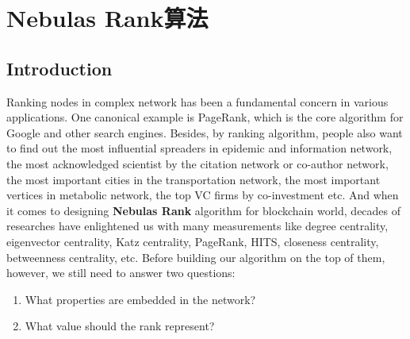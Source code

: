\section{Nebulas Rank算法}


\subsection{Introduction} \label{sec:intro}
Ranking nodes in complex network has been a fundamental concern in various applications. One canonical example is PageRank\cite{Brin2010}\cite{page1999pagerank}, which is the core algorithm for Google and other search engines\cite{langville2011google}. Besides, by ranking algorithm, people also want to find out the most influential spreaders in epidemic and information network\cite{doerr2012rumors}\cite{Kitsak2010}, the most acknowledged scientist by the citation network or co-author network\cite{walker2007ranking}\cite{chen2007finding}\cite{Radicchi2009}, the most important cities in the transportation network\cite{guimera2005worldwide}, the most important vertices in metabolic network\cite{ivan2010web}, the top VC firms by co-investment\cite{Bhat2012} etc. And when it comes to designing \textbf{Nebulas Rank} algorithm for blockchain world, decades of researches have enlightened us with many measurements like degree centrality\cite{freeman1979set}, eigenvector centrality\cite{bonacich1972factoring}, Katz centrality\cite{katz1953new}, PageRank\cite{Brin2010}, HITS\cite{kleinberg1999authoritative}, closeness centrality\cite{sabidussi1966centrality}, betweenness centrality\cite{freeman1977set}\cite{freeman1978centrality}\cite{freeman1991centrality}\cite{noh2004random}\cite{newman2005measure}, etc. Before building our algorithm on the top of them, however, we still need to answer two questions:

\begin{enumerate}
\item What properties are embedded in the network?
\item What value should the rank represent?
\end{enumerate}

